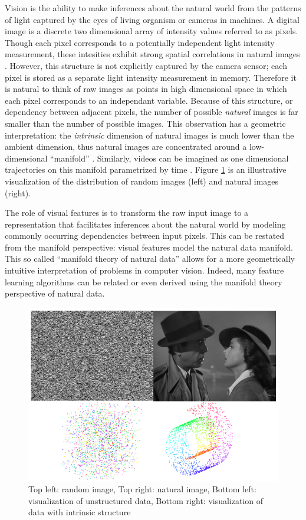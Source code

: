 Vision is the ability to make inferences about the natural world from the
patterns of light captured by the eyes of living organism or cameras in
machines. A digital image is a discrete two dimensional array of intensity
values referred to as pixels. Though each pixel corresponds to a potentially
independent light intensity measurement, these intesities exhibit strong
spatial correlations in natural images \cite{simoncelli2001}.  However, this
structure is not explicitly captured by the camera sensor; each pixel is stored
as a separate light intensity measurement in memory. Therefore it is natural to
think of raw images as points in high dimensional space in which each pixel
corresponds to an independant variable. Because of this structure, or
dependency between adjacent pixels, the number of possible \emph{natural}
images is far smaller than the number of possible images.  This observation has
a geometric interpretation: the \emph{intrinsic} dimension of natural images is
much lower than the ambient dimension, thus natural images are concentrated
around a low-dimensional ``manifold''
\cite{bengio2013,tenenbaum2000,roweis2000}. Similarly, videos can be imagined
as one dimensional trajectories on this manifold parametrized by time
\cite{goroshin2015}. Figure \ref{fig:structure} is an illustrative
visualization of the distribution of random images (left) and natural images
(right). 

The role of visual features is to transform the raw input image to a
representation that facilitates inferences about the natural world by modeling
commonly occurring dependencies between input pixels. This can be restated from
the manifold perspective: visual features model the natural data manifold.
This so called ``manifold theory of natural data'' allows for a more
geometrically intuitive interpretation of problems in computer vision. Indeed,
many feature learning algorithms can be related or even derived using the
manifold theory perspective of natural data. 

\begin{figure} 
\centering
\includegraphics[scale=0.3]{./figures/introduction/structure.png} 
\caption{Top left: random image, Top right: natural image, Bottom left: visualization of
unstructured data, Bottom right: visualization of data with intrinsic
structure} 
\label{fig:structure} 
\end{figure}  

